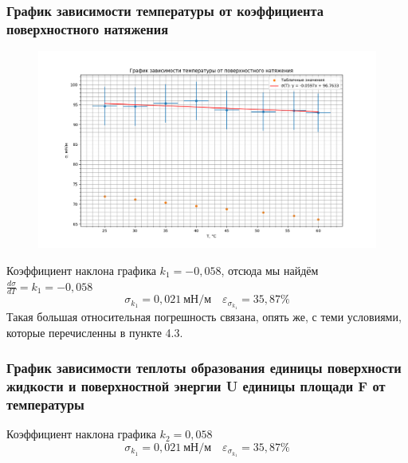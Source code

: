 \documentclass[a4paper,12pt]{article}
\begin{document}
                \subsubsection{График зависимости температуры от коэффициента поверхностного натяжения}

                 \begin{figure}[!ht]
                    \begin{center}
                        \includegraphics[width=1 \textwidth]{251-1gr.png}
                    \end{center}
                \end{figure}

                Коэффициент наклона графика $k_1 = -0,058$, отсюда мы найдём $\frac{d\sigma}{dT} = k_1 = -0,058$
                \[\sigma_{k_1} = 0,021 \ \text{мН/м} \quad \varepsilon_{\sigma_{k_1}} = 35,87 \%\]
                Такая большая относительная погрешность связана, опять же, с теми условиями, которые перечисленны в пункте 4.3.

                \subsubsection{График зависимости теплоты образования единицы поверхности жидкости и поверхностной энергии U единицы площади F от температуры}

                Коэффициент наклона графика $k_2 = 0,058$
                \[\sigma_{k_1} = 0,021 \ \text{мН/м} \quad \varepsilon_{\sigma_{k_1}} = 35,87 \%\]
\end{document}
